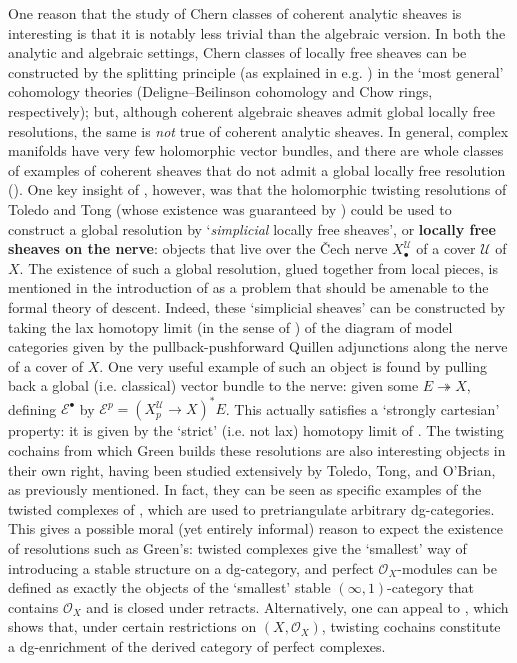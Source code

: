 \documentclass[11pt,fleqn]{article}
\theoremstyle{plain}
\theoremstyle{definition}
\theoremstyle{remark}
\numberwithin{equation}{theorem}
\newcommand{\cover}{\mathcal{U}}
\newcommand{\OO}{\mathcal{O}}
\newcommand{\define}[1]{\textbf{#1}}
\newcommand{\nerve}[1]{X_{#1}^\cover}
\begin{document}
    One reason that the study of Chern classes of coherent analytic sheaves is interesting is that it is notably less trivial than the algebraic version.
    In both the analytic and algebraic settings, Chern classes of locally free sheaves can be constructed by the splitting principle (as explained in e.g. \cite[§21]{Bott&Tu1982}) in the `most general' cohomology theories (Deligne--Beilinson cohomology and Chow rings, respectively); but, although coherent algebraic sheaves admit global locally free resolutions, the same is \emph{not} true of coherent analytic sheaves.
    In general, complex manifolds have very few holomorphic vector bundles, and there are whole classes of examples of coherent sheaves that do not admit a global locally free resolution (\cite[Corollary~A.5]{Voisin2002}).
    One key insight of \cite{Green1980}, however, was that the holomorphic twisting resolutions of Toledo and Tong (whose existence was guaranteed by \cite[Proposition~2.4]{Toledo&Tong1978}) could be used to construct a global resolution by `\emph{simplicial} locally free sheaves', or \define{locally free sheaves on the nerve}: objects that live over the Čech nerve $\nerve{\bullet}$ of a cover $\cover$ of $X$.
    The existence of such a global resolution, glued together from local pieces, is mentioned in the introduction of \cite{Hirschowitz&Simpson2001} as a problem that should be amenable to the formal theory of descent.
    Indeed, these `simplicial sheaves' can be constructed by taking the lax homotopy limit (in the sense of \cite[Definition~3.1]{Bergner2012}) of the diagram of model categories given by the pullback-pushforward Quillen adjunctions along the nerve of a cover of $X$.
    One very useful example of such an object is found by pulling back a global (i.e. classical) vector bundle to the nerve: given some $E\twoheadrightarrow X$, defining $\mathcal{E}^\bullet$ by $\mathcal{E}^p=(\nerve{p}\to X)^*E$.
    This actually satisfies a `strongly cartesian' property: it is given by the `strict' (i.e. not lax) homotopy limit of \cite{Bergner2012}.
    The twisting cochains from which Green builds these resolutions are also interesting objects in their own right, having been studied extensively by Toledo, Tong, and O'Brian, as previously mentioned.
    In fact, they can be seen as specific examples of the twisted complexes of \cite{Bondal&Kapranov1991}, which are used to pretriangulate arbitrary dg-categories.
    This gives a possible moral (yet entirely informal) reason to expect the existence of resolutions such as Green's: twisted complexes give the `smallest' way of introducing a stable structure on a dg-category, and perfect $\OO_X$-modules can be defined as exactly the objects of the `smallest' stable $(\infty,1)$-category that contains $\OO_X$ and is closed under retracts.
    Alternatively, one can appeal to \cite{Wei2016}, which shows that, under certain restrictions on $(X,\OO_X)$, twisting cochains constitute a dg-enrichment of the derived category of perfect complexes.
\end{document}
